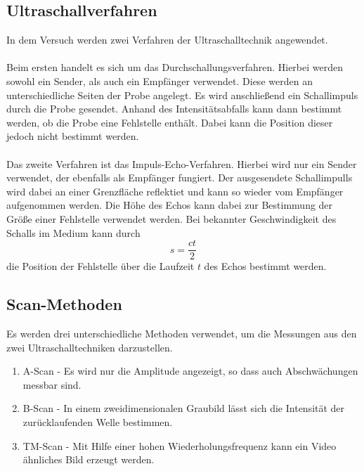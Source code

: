 \subsection{Ultraschallverfahren}
\label{sec:Ultraschallverfahren}
In dem Versuch werden zwei Verfahren der Ultraschalltechnik angewendet.\\ \\
Beim ersten handelt es sich um das Durchschallungsverfahren. Hierbei werden sowohl ein Sender, als auch ein Empfänger verwendet. Diese werden an unterschiedliche
Seiten der Probe angelegt. Es wird anschließend ein Schallimpuls durch die Probe gesendet. Anhand des Intensitätsabfalls kann dann bestimmt werden, ob die Probe eine
Fehlstelle enthält. Dabei kann die Position dieser jedoch nicht bestimmt werden.\\ \\
Das zweite Verfahren ist das Impuls-Echo-Verfahren. Hierbei wird nur ein Sender verwendet, der ebenfalls als Empfänger fungiert. Der ausgesendete Schallimpulls wird dabei
an einer Grenzfläche reflektiet und kann so wieder vom Empfänger aufgenommen werden. Die Höhe des Echos kann dabei zur Bestimmung der Größe einer Fehlstelle verwendet
werden. Bei bekannter Geschwindigkeit des Schalls im Medium kann durch
\begin{equation}
    \label{eqn:Strecke}
    s = \frac{ct}{2}
\end{equation}
die Position der Fehlstelle über die Laufzeit $t$ des Echos bestimmt werden.


\subsection{Scan-Methoden}
\label{sec:Scan}
Es werden drei unterschiedliche Methoden verwendet, um die Messungen aus den zwei Ultraschalltechniken darzustellen.
\begin{enumerate}
    \item A-Scan - Es wird nur die Amplitude angezeigt, so dass auch Abschwächungen messbar sind.
    \item B-Scan - In einem zweidimensionalen Graubild lässt sich die Intensität der zurücklaufenden Welle bestimmen.
    \item TM-Scan - Mit Hilfe einer hohen Wiederholungsfrequenz kann ein Video ähnliches Bild erzeugt werden.
\end{enumerate}

\cite{sample}
